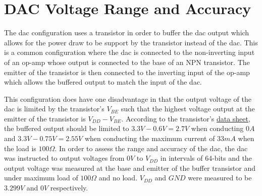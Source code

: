 \section{DAC Voltage Range and Accuracy}\label{sec:dac-voltage-range-and-accuracy}

The \gls{dac} configuration uses a transistor in order to buffer the \gls{dac} output which allows for the power draw to be support by the transistor instead of the \gls{dac}.
This is a common configuration where the \gls{dac} is connected to the non-inverting input of an op-amp whose output is connected to the base of an NPN transistor.
The emitter of the transistor is then connected to the inverting input of the op-amp which allows the buffered output to match the input of the \gls{dac}.

This configuration does have one disadvantage in that the output voltage of the \gls{dac} is limited by the transistor's $V_{BE}$ such that the highest voltage output at the emitter of the transistor is $V_{DD} - V_{BE}$.
According to the transistor's \href{https://www.lcsc.com/datasheet/lcsc_datasheet_2310131500_Jiangsu-Changjing-Electronics-Technology-Co---Ltd--S8050-J3Y-RANGE-200-350_C2146.pdf}{data sheet}, the buffered output should be limited to $3.3V - 0.6V = 2.7V$ when conducting $0A$ and $3.3V - 0.75V = 2.55V$ when conducting the maximum current of $33mA$ when the load is $100\Omega$.
In order to assess the range and accuracy of the \gls{dac}, the \gls{dac} was instructed to output voltages from $0V$ to $V_{DD}$ in intervals of 64-bits and the output voltage was measured at the base and emitter of the buffer transistor and under maximum load of $100\Omega$ and no load.
$V_{DD}$ and $GND$ were measured to be $3.299V$ and $0V$ respectively.

